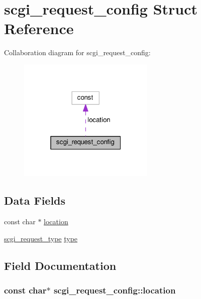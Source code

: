 \hypertarget{structscgi__request__config}{}\section{scgi\+\_\+request\+\_\+config Struct Reference}
\label{structscgi__request__config}


Collaboration diagram for scgi\+\_\+request\+\_\+config\+:
\nopagebreak
\begin{figure}[H]
\begin{center}
\leavevmode
\includegraphics[width=184pt]{structscgi__request__config__coll__graph}
\end{center}
\end{figure}
\subsection*{Data Fields}
\begin{DoxyCompactItemize}
\item 
const char $\ast$ \hyperlink{structscgi__request__config_a39fa18a6db89f54c03dc07d4cf80eba3}{location}
\item 
\hyperlink{mod__proxy__scgi_8c_adb41ee296dafd8c525150c242831a6e8}{scgi\+\_\+request\+\_\+type} \hyperlink{structscgi__request__config_a72b1090eb2802cfa408c2005deee81c9}{type}
\end{DoxyCompactItemize}


\subsection{Field Documentation}
\subsubsection[{\texorpdfstring{location}{location}}]{\setlength{\rightskip}{0pt plus 5cm}const char$\ast$ scgi\+\_\+request\+\_\+config\+::location}\hypertarget{structscgi__request__config_a39fa18a6db89f54c03dc07d4cf80eba3}{}\label{structscgi__request__config_a39fa18a6db89f54c03dc07d4cf80eba3}
